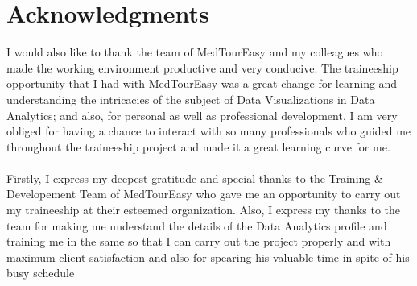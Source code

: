 \documentclass{article}
\begin{document}
\tableofcontents


\newpage
\section*{Acknowledgments}
\Large{I would also like to thank the team of MedTourEasy and my colleagues who made the working environment productive and very conducive. The traineeship opportunity that I had with MedTourEasy was a great change for learning and understanding the intricacies of the subject of Data Visualizations in Data Analytics; and also, for personal as well as professional development. I am very obliged for having a chance to interact with so many professionals who guided me throughout the traineeship project and made it a great learning curve for me. \\ \\ Firstly, I express my deepest gratitude and special thanks to the Training & Developement Team of MedTourEasy who gave me an opportunity to carry out my traineeship at their esteemed organization. Also, I express my thanks to the team for making me understand the details of the Data Analytics profile and training me in the same so that I can carry out the project properly and with maximum client satisfaction and also for spearing his valuable time in spite of his busy schedule}


\newpage
\end{document}
